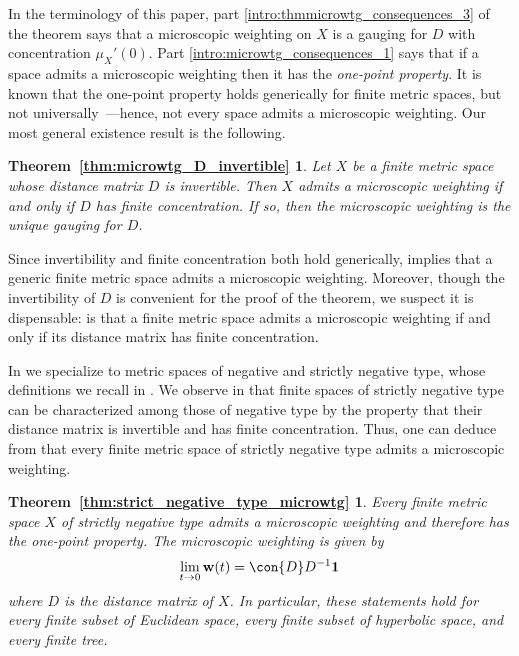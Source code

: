 \documentclass[a4paper, oneside, reqno]{amsart}
\newtheorem*{thmmicrowtg_D_invertible}{Theorem~\ref{thm:microwtg_D_invertible}}
\newtheorem*{thmstrict_negative_type_microwtg}{Theorem~\ref{thm:strict_negative_type_microwtg}}
\theoremstyle{definition}
\theoremstyle{remark}
\numberwithin{equation}{section}
\renewcommand{\vec}{\mathbf}
\newcommand{\onevector}{\mathbf{1}}
\begin{document}
In the terminology of this paper, part \eqref{intro:thmmicrowtg_consequences_3} of the theorem says that a microscopic weighting on \(X\) is a gauging for \(D\) with concentration \(\mu_X'(0)\). Part \eqref{intro:microwtg_consequences_1} says that if a space admits a microscopic weighting then it has the \emph{one-point property}. It is known that the one-point property holds generically for finite metric spaces, but not universally~\cite{RoffYoshinaga}---hence, not every space admits a microscopic weighting. Our most general existence result is the following.

\begin{thmmicrowtg_D_invertible}
    Let \(X\) be a finite metric space whose distance matrix \(D\) is invertible. Then \(X\) admits a microscopic weighting if and only if \(D\) has finite concentration. If so, then the microscopic weighting is the unique gauging for \(D\).
\end{thmmicrowtg_D_invertible}

Since invertibility and finite concentration both hold generically,  implies that a generic finite metric space admits a microscopic weighting. Moreover, though the invertibility of \(D\) is convenient for the proof of the theorem, we suspect it is dispensable:  is that a finite metric space admits a microscopic weighting if and only if its distance matrix has finite concentration.

In  we specialize to metric spaces of negative and strictly negative type, whose definitions we recall in . We observe in  that finite spaces of strictly negative type can be characterized among those of negative type by the property that their distance matrix is invertible and has finite concentration. Thus, one can deduce from  that every finite metric space of strictly negative type admits a microscopic weighting.

\begin{thmstrict_negative_type_microwtg}
Every finite metric space \(X\) of strictly negative type admits a microscopic weighting and therefore has the one-point property. The microscopic weighting is given by
\[\lim_{t \to 0} \vec{w}(t) = \con{D} D^{-1} \onevector\]
where \(D\) is the distance matrix of \(X\). In particular, these statements hold for every finite subset of Euclidean space, every finite subset of hyperbolic space, and every finite tree.
\end{thmstrict_negative_type_microwtg}
\end{document}
